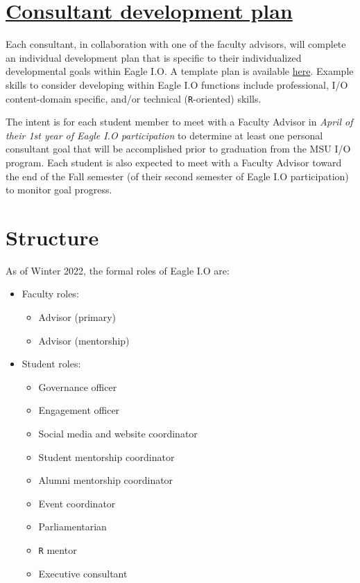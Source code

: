 \documentclass[
]{book}
\providecommand{\tightlist}{%
  \setlength{\itemsep}{0pt}\setlength{\parskip}{0pt}}
\begin{document}
\hypertarget{consultant-development-plan}{%
\section{\texorpdfstring{\href{https://docs.google.com/document/d/13OhBJgO4Lr40uA9s3tLBTm17TNRrQa-NJnfTIbSGmT4/edit?usp=sharing}{Consultant development plan}}{Consultant development plan}}\label{consultant-development-plan}}

Each consultant, in collaboration with one of the faculty advisors, will complete an individual development plan that is specific to their individualized developmental goals within Eagle I.O. A template plan is available \href{https://docs.google.com/document/d/13OhBJgO4Lr40uA9s3tLBTm17TNRrQa-NJnfTIbSGmT4/edit?usp=sharing}{here}. Example skills to consider developing within Eagle I.O functions include professional, I/O content-domain specific, and/or technical (\texttt{R}-oriented) skills.

The intent is for each student member to meet with a Faculty Advisor in \emph{April of their 1st year of Eagle I.O participation} to determine at least one personal consultant goal that will be accomplished prior to graduation from the MSU I/O program. Each student is also expected to meet with a Faculty Advisor toward the end of the Fall semester (of their second semester of Eagle I.O participation) to monitor goal progress.

\hypertarget{roles}{%
\section{Structure}\label{roles}}

As of Winter 2022, the formal roles of Eagle I.O are:

\begin{itemize}
\tightlist
\item
  Faculty roles:

  \begin{itemize}
  \tightlist
  \item
    Advisor (primary)
  \item
    Advisor (mentorship)
  \end{itemize}
\item
  Student roles:

  \begin{itemize}
  \tightlist
  \item
    Governance officer
  \item
    Engagement officer
  \item
    Social media and website coordinator
  \item
    Student mentorship coordinator
  \item
    Alumni mentorship coordinator\\
  \item
    Event coordinator
  \item
    Parliamentarian
  \item
    \texttt{R} mentor
  \item
    Executive consultant
  \end{itemize}
\end{itemize}
\end{document}

